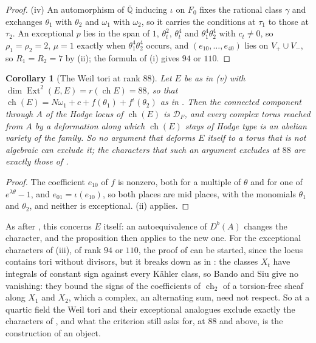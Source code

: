 \documentclass[11pt,reqno]{amsart}
\theoremstyle{plain}
\newtheorem{corollary}[theorem]{Corollary}
\theoremstyle{definition}
\theoremstyle{remark}
\newcommand{\QQ}{\mathbb{Q}}
\newcommand{\cD}{\mathcal{D}}
\DeclareMathOperator{\ch}{ch}
\DeclareMathOperator{\Ext}{Ext}
\newcommand{\bbar}[1]{\overline{#1}}
\begin{document}
\begin{proof}
(iv) An automorphism of $\bbar\QQ$ inducing $\iota$ on $F_{0}$ fixes the
rational class $\gamma$ and exchanges $\theta_{1}$ with $\theta_{2}$ and
$\omega_{1}$ with $\omega_{2}$, so it carries the conditions at $\tau_{1}$ to
those at $\tau_{2}$. An exceptional $p$ lies in the span of $1$,
$\theta_{t}^{2}$, $\theta_{t}^{4}$ and $\theta_{1}^{4}\theta_{2}^{4}$ with
$c_{t}\ne0$, so $\rho_{1}=\rho_{2}=2$, $\mu=1$ exactly when
$\theta_{1}^{4}\theta_{2}^{4}$ occurs, and $(e_{10},\dots,e_{40})$ lies on
$V_{+}\cup V_{-}$, so $R_{1}=R_{2}=7$ by (ii); the
formula of (i) gives $94$ or $110$.
\end{proof}

\begin{corollary}[The Weil tori at rank $88$]\label{cor:quarticlocus}
Let $E$ be as in \textup{(v)} with
$\dim\Ext^{2}(E,E)=r(\ch E)=88$, so that $\ch(E)=N\omega_{1}+c+f(\theta_{1})
+f^{\iota}(\theta_{2})$ as in . Then the connected
component through $A$ of the Hodge locus of $\ch(E)$ is $\cD_{F}$, and every
complex torus reached from $A$ by a deformation along which $\ch(E)$ stays of
Hodge type is an abelian variety of the family. So no argument that deforms
$E$ itself to a torus that is not algebraic can exclude it; the characters
that such an argument excludes at $88$ are exactly those of
.
\end{corollary}

\begin{proof}
The coefficient $e_{10}$ of $f$ is nonzero, both for a multiple of $\theta$
and for one of $e^{\lambda\theta}-1$, and $e_{01}=\iota(e_{10})$, so both
places are mid places, with the monomials $\theta_{1}$ and $\theta_{2}$, and
neither is exceptional. (ii) applies.
\end{proof}

As after , this concerns $E$ itself: an
autoequivalence of $D^{b}(A)$ changes the character, and the proposition then
applies to the new one. For the exceptional characters of
(iii), of rank $94$ or $110$, the proof of
 can be started, since the locus contains tori without
divisors, but it breaks down as in : the classes
$X_{t}$ have integrals of constant sign against every K\"ahler class, so
Bando and Siu give no vanishing: they bound the signs of the coefficients of
$\ch_{2}$ of a torsion-free sheaf along $X_{1}$ and $X_{2}$, which a complex,
an alternating sum, need not respect. So at a
quartic field the Weil tori and their exceptional analogues exclude exactly
the characters of , and what the criterion still
asks for, at $88$ and above, is the construction of an object.
\end{document}
